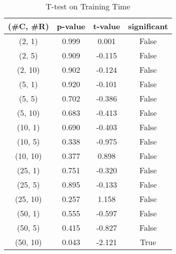 \begin{table}[h]
\centering
\caption{T-test on Training Time}
\label{tab:t-testTraining}
\begin{tabular}{|c|c|c|c|}
\toprule
(\#C, \#R) &  p-value &  t-value &  significant \\
\midrule
  (2, 1) &    0.999 &    0.001 &        False \\
  (2, 5) &    0.909 &   -0.115 &        False \\
 (2, 10) &    0.902 &   -0.124 &        False \\
  (5, 1) &    0.920 &   -0.101 &        False \\
  (5, 5) &    0.702 &   -0.386 &        False \\
 (5, 10) &    0.683 &   -0.413 &        False \\
 (10, 1) &    0.690 &   -0.403 &        False \\
 (10, 5) &    0.338 &   -0.975 &        False \\
(10, 10) &    0.377 &    0.898 &        False \\
 (25, 1) &    0.751 &   -0.320 &        False \\
 (25, 5) &    0.895 &   -0.133 &        False \\
(25, 10) &    0.257 &    1.158 &        False \\
 (50, 1) &    0.555 &   -0.597 &        False \\
 (50, 5) &    0.415 &   -0.827 &        False \\
(50, 10) &    0.043 &   -2.121 &         True \\
\bottomrule
\end{tabular}
\end{table}

